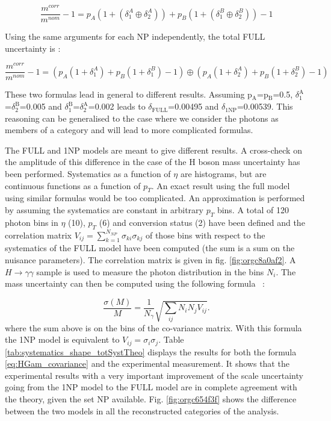 \begin{enumerate}
\begin{equation}
    \frac{m^{corr}}{m^{nom}} -1 = p_A(1+(\delta_{1}^A\oplus \delta_{2}^A )) + p_B(1+(\delta_{1}^B\oplus \delta_{2}^B)) -1
\end{equation}

Using the same arguments for each NP independently, the total FULL uncertainty is :

\begin{equation}
  \frac{m^{corr}}{m^{nom}} -1 =\left(p_A(1+\delta_{1}^A) + p_B(1+\delta_{1}^B) -1 \right) \oplus \left( p_A(1+\delta_{2}^A) + p_B(1+\delta_{2}^B) -1 \right)
\end{equation}

These two formulas lead in general to different results.
Assuming p\(_{\text{A}}\)=p\(_{\text{B}}\)=0.5, \(\delta_{\text{1}}^{\text{A}}\)=\(\delta_{\text{2}}^{\text{B}}\)=0.005 and \(\delta_{\text{1}}^{\text{B}}\)=\(\delta_{\text{2}}^{\text{A}}\)=0.002 leads to \(\delta_{\text{FULL}}\)=0.00495 and \(\delta_{\text{1NP}}\)=0.00539.
This reasoning can be generalised to the case where we consider the photons as members of a category and will lead to more complicated formulas.

The FULL and 1NP models are meant to give different results.
A cross-check on the amplitude of this difference in the case of the H boson mass uncertainty has been performed.
Systematics as a function of $\eta$ are histograms, but are continuous functions as a function of $p_T$.
An exact result using the full model using similar formulas would be too complicated.
An approximation is performed by assuming the systematics are constant in arbitrary $p_T$ bins.
A total of 120 photon bins in $\eta$ (10), $p_T$ (6) and conversion status (2) have been defined and the correlation matrix $V_{ij} = \sum_{k=1}^{N_{NP}} \sigma_{ki}\sigma_{kj}$ of those bins with respect to the systematics of the FULL model have been computed (the sum is a sum on the nuisance parameters).
The correlation matrix  is given in fig. \ref{fig:orgc8a0af2}.
A $H\rightarrow\gamma\gamma$ sample is used to measure the photon distribution in the bins \(N_i\).
The mass uncertainty can then be computed using the following formula \cite{170125_Goudet}~:

\begin{equation}
  \frac{\sigma(M)}{M} = \frac{1}{N_\gamma}\sqrt{\sum_{ij}N_iN_jV_{ij}}.
  \label{eq:HGam_covariance}
\end{equation}
where the sum above is on the bins of the co-variance matrix.
With this formula the 1NP model is equivalent to $V_{ij}=\sigma_i\sigma_j$.
Table \ref{tab:systematics_shape_totSystTheo} displays the results for both the formula \ref{eq:HGam_covariance} and the experimental measurement.
It shows that the experimental results with a very important improvement of the scale uncertainty going from the 1NP model to the FULL model are in complete agreement with the theory, given the set NP available.
Fig. \ref{fig:orgc654f3f} shows the difference between the two models in all the reconstructed categories of the analysis.


\end{enumerate}
